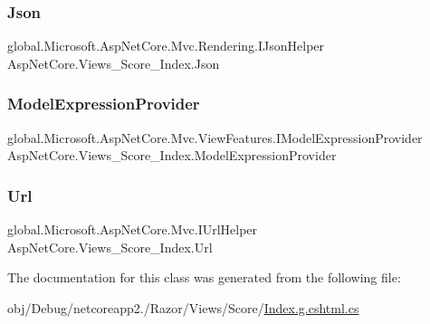 \subsubsection{\texorpdfstring{Json}{Json}}
{\footnotesize\ttfamily global.\+Microsoft.\+Asp\+Net\+Core.\+Mvc.\+Rendering.\+I\+Json\+Helper Asp\+Net\+Core.\+Views\+\_\+\+Score\+\_\+\+Index.\+Json\hspace{0.3cm}{\ttfamily [get]}}

\mbox{\label{class_asp_net_core_1_1_views___score___index_a5e204f9cea9237150c336ec8c130fcb0}} 
\subsubsection{\texorpdfstring{ModelExpressionProvider}{ModelExpressionProvider}}
{\footnotesize\ttfamily global.\+Microsoft.\+Asp\+Net\+Core.\+Mvc.\+View\+Features.\+I\+Model\+Expression\+Provider Asp\+Net\+Core.\+Views\+\_\+\+Score\+\_\+\+Index.\+Model\+Expression\+Provider\hspace{0.3cm}{\ttfamily [get]}}

\mbox{\label{class_asp_net_core_1_1_views___score___index_afbd529b0da1d92fe9dc75cb7b8308deb}} 
\subsubsection{\texorpdfstring{Url}{Url}}
{\footnotesize\ttfamily global.\+Microsoft.\+Asp\+Net\+Core.\+Mvc.\+I\+Url\+Helper Asp\+Net\+Core.\+Views\+\_\+\+Score\+\_\+\+Index.\+Url\hspace{0.3cm}{\ttfamily [get]}}



The documentation for this class was generated from the following file\+:\begin{DoxyCompactItemize}
\item 
obj/\+Debug/netcoreapp2./\+Razor/\+Views/\+Score/\mbox{\hyperlink{_score_2_index_8g_8cshtml_8cs}{Index.\+g.\+cshtml.\+cs}}\end{DoxyCompactItemize}
